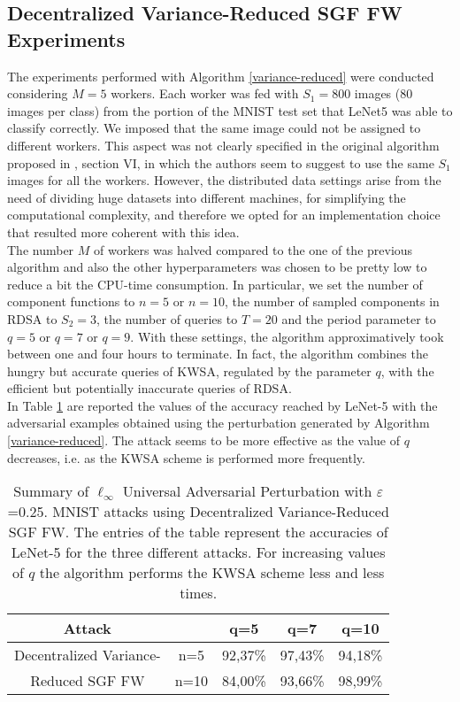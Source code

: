 \subsection{Decentralized Variance-Reduced SGF FW Experiments}
The experiments performed with Algorithm \ref{variance-reduced} were conducted considering $M=5$ workers. Each worker was fed with $S_1=800$ images (80 images per class) from the portion of the MNIST test set that LeNet5 was able to classify correctly. We imposed that the same image could not be assigned to different workers. This aspect was not clearly specified in the original algorithm proposed in \cite{A3}, section VI, in which the authors seem to suggest to use the same $S_1$ images for all the workers. However, the distributed data settings arise from the need of dividing huge datasets into different machines, for simplifying the computational complexity, and therefore we opted for an implementation choice that resulted more coherent with this idea.\\  \indent The number $M$ of workers was halved compared to the one of the previous algorithm and also the other hyperparameters was chosen to be pretty low to reduce a bit the CPU-time consumption. In particular, we set the number of component functions to $n=5$ or $n=10$, the number of sampled components in RDSA to $S_2=3$, the number of queries to $T=20$ and the period parameter to $q=5$ or $q=7$ or $q=9$. With these settings, the algorithm approximatively took between one and four hours to terminate. In fact, the algorithm combines the hungry but accurate queries of KWSA, regulated by the parameter $q$, with the efficient but potentially inaccurate queries of RDSA.\\
\indent In Table \ref{tab:vr} are reported the values of the accuracy reached by LeNet-5 with the adversarial examples obtained using the perturbation generated by Algorithm \ref{variance-reduced}. The attack seems to be more effective as the value of $q$ decreases, i.e. as the KWSA scheme is performed more frequently.\\
\begin{table}[htbp]
	\begin{center}
		\begin{adjustwidth}{-.3cm}{}
			\begin{tabular}{c|cccc}
				\textbf{Attack} &    &      q=5 &      q=7 &     q=10 \\
				\midrule
				{\small Decentralized Variance-}  & n=5   &    92,37\% &    97,43\% &       94,18\% \\
				{\small Reduced SGF FW}     &  n=10&  84,00\% &    93,66\% &       98,99\% \\
			\end{tabular}
		\end{adjustwidth}
	\end{center}
\caption{{\small Summary of $\ell_\infty$ Universal Adversarial Perturbation with $\varepsilon$=0.25. MNIST attacks using Decentralized Variance-Reduced SGF FW. The entries of the table represent the accuracies of LeNet-5 for the three different attacks. For increasing values of $q$ the algorithm performs the KWSA scheme less and less times.}}
	\label{tab:vr}
\end{table}

